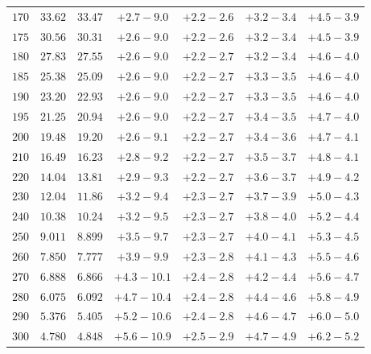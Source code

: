 \begin{table}[p]
\begin{center}
\begin{tabular}{ccccccc}
$170 $&$  33.62 $&$ 33.47 $&$ +2.7  -\!9.0  $&$ +2.2  -\!2.6 $&$ +3.2  -\!3.4 $&$ +4.5  -\!3.9 $\\
$175 $&$  30.56 $&$ 30.31 $&$ +2.6  -\!9.0  $&$ +2.2  -\!2.6 $&$ +3.2  -\!3.4 $&$ +4.5  -\!3.9 $\\
$180 $&$  27.83 $&$ 27.55 $&$ +2.6  -\!9.0  $&$ +2.2  -\!2.7 $&$ +3.2  -\!3.4 $&$ +4.6  -\!4.0 $\\
$185 $&$  25.38 $&$ 25.09 $&$ +2.6  -\!9.0  $&$ +2.2  -\!2.7 $&$ +3.3  -\!3.5 $&$ +4.6  -\!4.0 $\\
$190 $&$  23.20 $&$ 22.93 $&$ +2.6  -\!9.0  $&$ +2.2  -\!2.7 $&$ +3.3  -\!3.5 $&$ +4.6  -\!4.0 $\\
$195 $&$  21.25 $&$ 20.94 $&$ +2.6  -\!9.0  $&$ +2.2  -\!2.7 $&$ +3.4  -\!3.5 $&$ +4.7  -\!4.0 $\\
$200 $&$  19.48 $&$ 19.20 $&$ +2.6  -\!9.1  $&$ +2.2  -\!2.7 $&$ +3.4  -\!3.6 $&$ +4.7  -\!4.1 $\\
$210 $&$  16.49 $&$ 16.23 $&$ +2.8  -\!9.2  $&$ +2.2  -\!2.7 $&$ +3.5  -\!3.7 $&$ +4.8  -\!4.1 $\\
$220 $&$  14.04 $&$ 13.81 $&$ +2.9  -\!9.3  $&$ +2.2  -\!2.7 $&$ +3.6  -\!3.7 $&$ +4.9  -\!4.2 $\\
$230 $&$  12.04 $&$ 11.86 $&$ +3.2  -\!9.4  $&$ +2.3  -\!2.7 $&$ +3.7  -\!3.9 $&$ +5.0  -\!4.3 $\\
$240 $&$  10.38 $&$ 10.24 $&$ +3.2  -\!9.5  $&$ +2.3  -\!2.7 $&$ +3.8  -\!4.0 $&$ +5.2  -\!4.4 $\\
$250 $&$  9.011 $&$ 8.899 $&$ +3.5  -\!9.7  $&$ +2.3  -\!2.7 $&$ +4.0  -\!4.1 $&$ +5.3  -\!4.5 $\\
$260 $&$  7.850 $&$ 7.777 $&$ +3.9  -\!9.9  $&$ +2.3  -\!2.8 $&$ +4.1  -\!4.3 $&$ +5.5  -\!4.6 $\\
$270 $&$  6.888 $&$ 6.866 $&$ +4.3  -\!10.1 $&$ +2.4  -\!2.8 $&$ +4.2  -\!4.4 $&$ +5.6  -\!4.7 $\\
$280 $&$  6.075 $&$ 6.092 $&$ +4.7  -\!10.4 $&$ +2.4  -\!2.8 $&$ +4.4  -\!4.6 $&$ +5.8  -\!4.9 $\\
$290 $&$  5.376 $&$ 5.405 $&$ +5.2  -\!10.6 $&$ +2.4  -\!2.8 $&$ +4.6  -\!4.7 $&$ +6.0  -\!5.0 $\\
$300 $&$  4.780 $&$ 4.848 $&$ +5.6  -\!10.9 $&$ +2.5  -\!2.9 $&$ +4.7  -\!4.9 $&$ +6.2  -\!5.2 $\\ \hline
  \end{tabular}
   \end{center}
\end{table}

